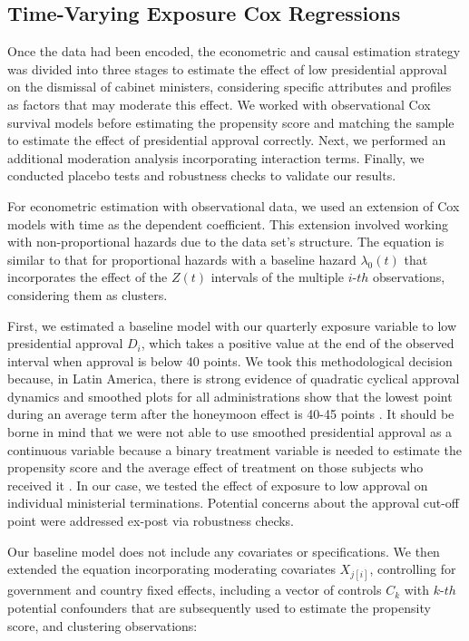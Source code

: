 \documentclass[12pt,halfline,a4paper]{ouparticle}
\begin{document}
\subsection{Time-Varying Exposure Cox Regressions}
\label{sec3.2}

Once the data had been encoded, the econometric and causal estimation strategy was divided into three stages to estimate the effect of low presidential approval on the dismissal of cabinet ministers, considering specific attributes and profiles as factors that may moderate this effect. We worked with observational Cox survival models before estimating the propensity score and matching the sample to estimate the effect of presidential approval correctly. Next, we performed an additional moderation analysis incorporating interaction terms. Finally, we conducted placebo tests and robustness checks to validate our results.

For econometric estimation with observational data, we used an extension of Cox models with time as the dependent coefficient. This extension involved working with non-proportional hazards due to the data set’s structure. The equation is similar to that for proportional hazards with a baseline hazard $\lambda_{0}(t)$ that incorporates the effect of the $Z(t)$ intervals of the multiple $i$-$th$ observations, considering them as clusters. 

First, we estimated a baseline model with our quarterly exposure variable to low presidential approval $D_{i}$, which takes a positive value at the end of the observed interval when approval is below 40 points. We took this methodological decision because, in Latin America, there is strong evidence of quadratic cyclical approval dynamics and smoothed plots for all administrations show that the lowest point during an average term after the honeymoon effect is 40-45 points \citep{Carlin2019b, Carlin2018}. It should be borne in mind that we were not able to use smoothed presidential approval as a continuous variable because a binary treatment variable is needed to estimate the propensity score and the average effect of treatment on those subjects who received it \citep{Austin2011, Ho2011}. In our case, we tested the effect of exposure to low approval on individual ministerial terminations. Potential concerns about the approval cut-off point were addressed ex-post via robustness checks.

Our baseline model does not include any covariates or specifications. We then extended the equation incorporating moderating covariates $X_{j[i]}$, controlling for government and country fixed effects, including a vector of controls $C_{k}$ with $k$-$th$ potential confounders that are subsequently used to estimate the propensity score, and clustering observations:
\end{document}
